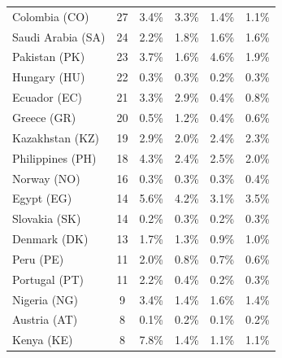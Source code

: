 {\begin{table}[ht]
{\begin{tabular}{lccccc}
Colombia (CO)         &    27  & 3.4\% & 3.3\% & 1.4\% & 1.1\% \\  %
Saudi Arabia (SA)     &    24  & 2.2\% & 1.8\% & 1.6\% & 1.6\% \\  %
Pakistan (PK)         &    23  & \cellcolor{red0} 3.7\% & \cellcolor{green1} 1.6\% & \cellcolor{red1} 4.6\% & \cellcolor{green0} 1.9\% \\  %
Hungary (HU)          &    22  & 0.3\% & 0.3\% & 0.2\% & 0.3\% \\  %
Ecuador (EC)          &    21  & 3.3\% & 2.9\% & 0.4\% & 0.8\% \\  %
Greece (GR)           &    20  & 0.5\% & \cellcolor{red0} 1.2\% & 0.4\% & 0.6\% \\  %
Kazakhstan (KZ)       &    19  & 2.9\% & 2.0\% & 2.4\% & 2.3\% \\  %
Philippines (PH)      &    18  & \cellcolor{red0} 4.3\% & 2.4\% & 2.5\% & 2.0\% \\  %
Norway (NO)           &    16  & 0.3\% & 0.3\% & 0.3\% & \cellcolor{red0} 0.4\% \\  %
Egypt (EG)            &    14  & \cellcolor{red0} 5.6\% & 4.2\% & 3.1\% & 3.5\% \\  %
Slovakia (SK)         &    14  & 0.2\% & 0.3\% & 0.2\% & 0.3\% \\  %
Denmark (DK)          &    13  & 1.7\% & 1.3\% & 0.9\% & 1.0\% \\  %
Peru (PE)             &    11  & \cellcolor{red1} 2.0\% & 0.8\% & 0.7\% & \cellcolor{green0} 0.6\% \\  %
Portugal (PT)         &    11  & \cellcolor{red1} 2.2\% & 0.4\% & \cellcolor{green0} 0.2\% & 0.3\% \\  %
Nigeria (NG)          &     9  & \cellcolor{red1} 3.4\% & 1.4\% & 1.6\% & 1.4\% \\  %
Austria (AT)          &     8  & \cellcolor{green0} 0.1\% & \cellcolor{red1} 0.2\% & \cellcolor{green1} 0.1\% & \cellcolor{red0} 0.2\% \\  %
Kenya (KE)            &     8  & \cellcolor{red5}  7.8\% & \cellcolor{green0} 1.4\% & \cellcolor{green0} 1.1\% & \cellcolor{green0} 1.1\% \\  %

\end{tabular}}
\end{table}}
